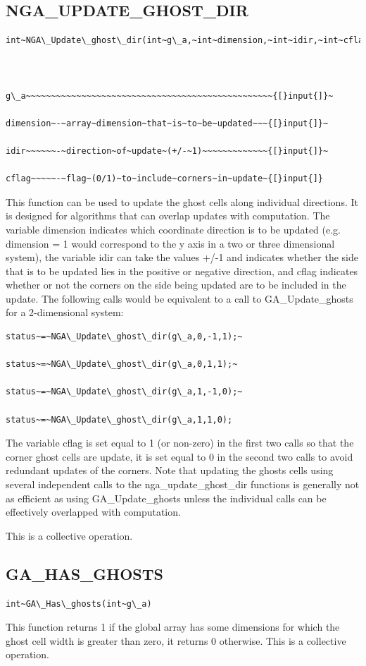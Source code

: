 \subsection*{\label{sub:NGA_UPDATE_GHOST_DIR}NGA\_UPDATE\_GHOST\_DIR}
\begin{verbatim}
int~NGA\_Update\_ghost\_dir(int~g\_a,~int~dimension,~int~idir,~int~cflag)



g\_a~~~~~~~~~~~~~~~~~~~~~~~~~~~~~~~~~~~~~~~~~~~~~~~~~{[}input{]}~

dimension~-~array~dimension~that~is~to~be~updated~~~{[}input{]}~

idir~~~~~~-~direction~of~update~(+/-~1)~~~~~~~~~~~~~{[}input{]}~

cflag~~~~~-~flag~(0/1)~to~include~corners~in~update~{[}input{]}
\end{verbatim}
This function can be used to update the ghost cells along individual
directions. It is designed for algorithms that can overlap updates
with computation. The variable dimension indicates which coordinate
direction is to be updated (e.g. dimension = 1 would correspond to
the y axis in a two or three dimensional system), the variable idir
can take the values +/-1 and indicates whether the side that is to
be updated lies in the positive or negative direction, and cflag indicates
whether or not the corners on the side being updated are to be included
in the update. The following calls would be equivalent to a call to
GA\_Update\_ghosts for a 2-dimensional system: 
\begin{verbatim}
status~=~NGA\_Update\_ghost\_dir(g\_a,0,-1,1);~

status~=~NGA\_Update\_ghost\_dir(g\_a,0,1,1);~

status~=~NGA\_Update\_ghost\_dir(g\_a,1,-1,0);~

status~=~NGA\_Update\_ghost\_dir(g\_a,1,1,0);
\end{verbatim}
The variable cflag is set equal to 1 (or non-zero) in the first two
calls so that the corner ghost cells are update, it is set equal to
0 in the second two calls to avoid redundant updates of the corners.
Note that updating the ghosts cells using several independent calls
to the nga\_update\_ghost\_dir functions is generally not as efficient
as using GA\_Update\_ghosts unless the individual calls can be effectively
overlapped with computation.

This is a collective operation. 


\subsection*{\label{sub:GA_HAS_GHOSTS}GA\_HAS\_GHOSTS}
\begin{verbatim}
int~GA\_Has\_ghosts(int~g\_a)
\end{verbatim}
This function returns 1 if the global array has some dimensions for
which the ghost cell width is greater than zero, it returns 0 otherwise.
This is a collective operation. 


